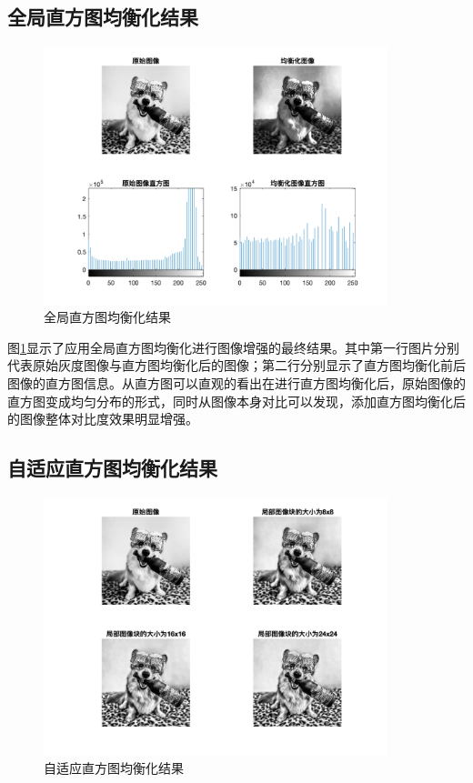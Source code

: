 \documentclass[conference]{IEEEtran}
\begin{document}
\subsection{全局直方图均衡化结果}
\begin{figure}[htbp]
	\centerline{
		\includegraphics[width=10cm]{q1_1.png} 	
	}
	\caption{全局直方图均衡化结果}
	\label{pic1}
\end{figure}

图\ref{pic1}显示了应用全局直方图均衡化进行图像增强的最终结果。其中第一行图片分别代表原始灰度图像与直方图均衡化后的图像；第二行分别显示了直方图均衡化前后图像的直方图信息。从直方图可以直观的看出在进行直方图均衡化后，原始图像的直方图变成均匀分布的形式，同时从图像本身对比可以发现，添加直方图均衡化后的图像整体对比度效果明显增强。

\subsection{自适应直方图均衡化结果}
\begin{figure}[htbp]
	\centerline{
		\includegraphics[width=10cm]{q1_2.png} 	
	}
	\caption{自适应直方图均衡化结果}
	\label{pic2}
\end{figure}
\end{document}
